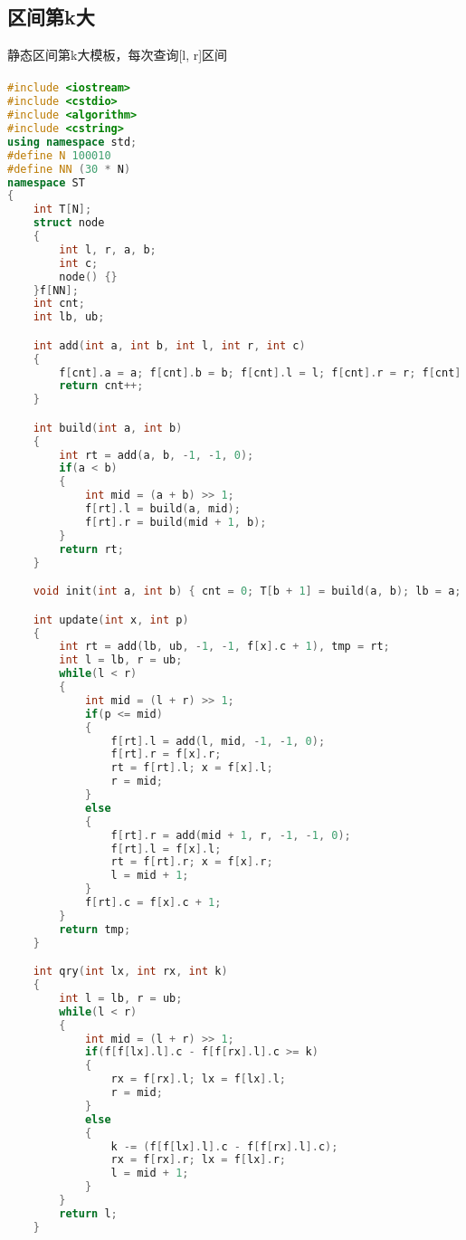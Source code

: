 ﻿\subsection{区间第k大}
	静态区间第k大模板，每次查询[l, r]区间
	\paragraph{}
	\begin{lstlisting}[language=C++]
#include <iostream>
#include <cstdio>
#include <algorithm>
#include <cstring>
using namespace std;
#define N 100010
#define NN (30 * N)
namespace ST
{
    int T[N];
    struct node
    {
        int l, r, a, b;
        int c;
        node() {}
    }f[NN];
    int cnt;
    int lb, ub;

    int add(int a, int b, int l, int r, int c)
    {
        f[cnt].a = a; f[cnt].b = b; f[cnt].l = l; f[cnt].r = r; f[cnt].c = c;
        return cnt++;
    }

    int build(int a, int b)
    {
        int rt = add(a, b, -1, -1, 0);
        if(a < b)
        {
            int mid = (a + b) >> 1;
            f[rt].l = build(a, mid);
            f[rt].r = build(mid + 1, b);
        }
        return rt;
    }

    void init(int a, int b) { cnt = 0; T[b + 1] = build(a, b); lb = a; ub = b; }

    int update(int x, int p)
    {
        int rt = add(lb, ub, -1, -1, f[x].c + 1), tmp = rt;
        int l = lb, r = ub;
        while(l < r)
        {
            int mid = (l + r) >> 1;
            if(p <= mid)
            {
                f[rt].l = add(l, mid, -1, -1, 0);
                f[rt].r = f[x].r;
                rt = f[rt].l; x = f[x].l;
                r = mid;
            }
            else
            {
                f[rt].r = add(mid + 1, r, -1, -1, 0);
                f[rt].l = f[x].l;
                rt = f[rt].r; x = f[x].r;
                l = mid + 1;
            }
            f[rt].c = f[x].c + 1;
        }
        return tmp;
    }

    int qry(int lx, int rx, int k)
    {
        int l = lb, r = ub;
        while(l < r)
        {
            int mid = (l + r) >> 1;
            if(f[f[lx].l].c - f[f[rx].l].c >= k)
            {
                rx = f[rx].l; lx = f[lx].l;
                r = mid;
            }
            else
            {
                k -= (f[f[lx].l].c - f[f[rx].l].c);
                rx = f[rx].r; lx = f[lx].r;
                l = mid + 1;
            }
        }
        return l;
    }


\end{lstlisting}
